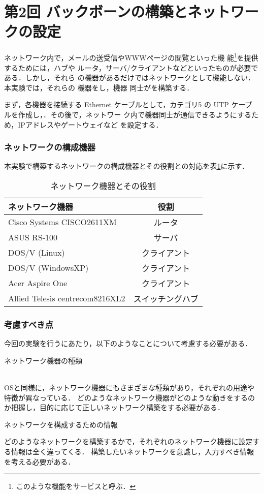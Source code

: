 \section{第2回 バックボーンの構築とネットワークの設定}

ネットワーク内で，メールの送受信やWWWページの閲覧といった機
能\footnote{このような機能をサービスと呼ぶ．}を提供するためには，ハブや
ルータ，サーバ/クライアントなどといったものが必要である．しかし，それら
の機器があるだけではネットワークとして機能しない．本実験では，それらの
機器を\textbf{}し，機器
同士が\textbf{}を構築する．

まず，各機器を接続する Ethernet ケーブルとして，カテゴリ5 の UTP ケーブ
ルを作成し，\textbf{}．その後で，ネットワー
ク内で機器同士が通信できるようにするため，IPアドレスやゲートウェイなど
を設定する．

\subsubsection*{ネットワークの構成機器}
本実験で構築するネットワークの構成機器とその役割との対応を表\ref{sp2:tab:network}に示す．

\begin{table}[htbp]
\begin{center}
\caption{ネットワーク機器とその役割}
\label{sp2:tab:network}
\begin{tabular}{|l|c|}
\hline
ネットワーク機器 & 役割 \\ \hline
Cisco Systems CISCO2611XM & ルータ \\ \hline
ASUS RS-100 & サーバ \\ \hline
DOS/V (Linux) & クライアント \\ \hline
DOS/V (WindowsXP) & クライアント \\ \hline
Acer Aspire One & クライアント \\ \hline
Allied Telesis centrecom8216XL2 & スイッチングハブ \\
\hline
\end{tabular}
\end{center}
\end{table}

\subsubsection*{考慮すべき点}
今回の実験を行うにあたり，以下のようなことについて考慮する必要がある．
\begin{itemize}
{\bf \item{ネットワーク機器の種類}}\\
OSと同様に，ネットワーク機器にもさまざまな種類があり，それぞれの用途や特徴が異なっている．
どのようなネットワーク機器がどのような動きをするのか把握し，目的に応じて正しいネットワーク構築をする必要がある．

{\bf \item{ネットワークを構成するための情報}}

どのようなネットワークを構築するかで，それぞれのネットワーク機器に設定する情報は全く違ってくる．
構築したいネットワークを意識し，入力すべき情報を考える必要がある．
\end{itemize}
